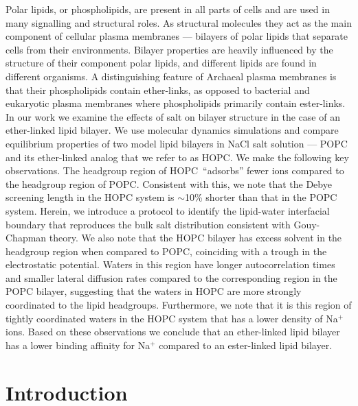 \documentclass[12pt,openany,final]{book}
\newcommand{\about}{$\sim$}
\begin{document}
Polar lipids, or phospholipids, are present in all parts of cells
and are used in many signalling and structural roles.
As structural molecules they act as the main component of cellular plasma membranes --- bilayers
of polar lipids that separate cells from their environments. Bilayer properties are heavily
influenced by the structure of their component polar lipids, and different lipids
are found in different organisms. 
A distinguishing feature of Archaeal plasma membranes is that their phospholipids contain ether-links, as opposed to bacterial and eukaryotic plasma
membranes where phospholipids primarily contain ester-links. In our work we examine the effects of
salt on bilayer structure in the case of an ether-linked lipid bilayer. We use molecular dynamics simulations and compare equilibrium properties of two model lipid
bilayers in NaCl salt solution --- POPC and its ether-linked analog that we refer to as HOPC. We make the following key observations.
The headgroup region of HOPC~``adsorbs'' fewer ions compared to the headgroup region of POPC. Consistent with this,
we note that the Debye screening length in the HOPC system is \about 10\% shorter than that
in the POPC system. Herein, we introduce a protocol to identify the lipid-water interfacial boundary that
reproduces the bulk salt distribution consistent with
Gouy-Chapman theory. We also note that the HOPC bilayer has excess solvent
in the headgroup region when compared to POPC,
coinciding with a trough in the electrostatic potential. Waters in
this region have longer autocorrelation times and smaller lateral diffusion rates compared to the corresponding region
in the POPC bilayer, suggesting that the waters in HOPC are more strongly
coordinated to the lipid headgroups. Furthermore, we note that it is this
region of tightly coordinated waters in the HOPC system that has a lower density of Na$^+$ ions.
Based on these observations we conclude that an ether-linked lipid bilayer has a lower binding
affinity for Na$^+$ compared to an ester-linked lipid bilayer.

\chapter{Introduction}
\linenumbers
{}
\end{document}
